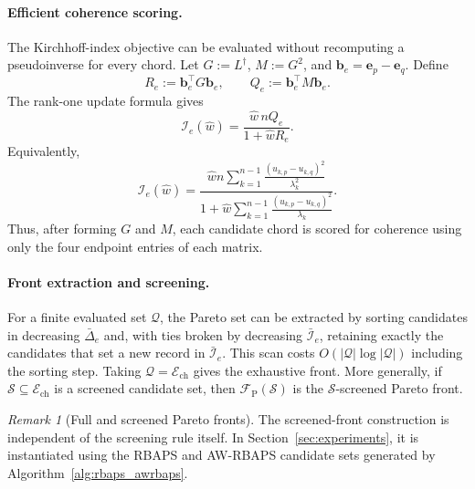 \documentclass[11pt]{article}
\numberwithin{equation}{section}
\theoremstyle{definition}
\theoremstyle{remark}
\newtheorem{remark}[theorem]{Remark}
\begin{document}
\paragraph{Efficient coherence scoring.}
The Kirchhoff-index objective can be evaluated without recomputing a
pseudoinverse for every chord. Let $G:=L^\dagger$, $M:=G^2$, and
$\boldsymbol b_e=\boldsymbol e_p-\boldsymbol e_q$. Define
\begin{equation}\label{eq:pareto_Re_Qe_def}
	R_e:=\boldsymbol b_e^\top G\boldsymbol b_e,
	\qquad
	Q_e:=\boldsymbol b_e^\top M\boldsymbol b_e .
\end{equation}
The rank-one update formula gives
\begin{equation}\label{eq:pareto_fast_kirchhoff}
	\mathcal I_e(\hat w)
	=
	\frac{\hat w\, n Q_e}{1+\hat w R_e}.
\end{equation}
Equivalently,
\begin{equation}\label{eq:pareto_fast_kirchhoff_spectral}
	\mathcal I_e(\hat w)
	=
	\frac{\hat w n\displaystyle\sum_{k=1}^{n-1}
		\frac{(u_{k,p}-u_{k,q})^2}{\lambda_k^2}}
	{1+\hat w\displaystyle\sum_{k=1}^{n-1}
		\frac{(u_{k,p}-u_{k,q})^2}{\lambda_k}}.
\end{equation}
Thus, after forming $G$ and $M$, each candidate chord is scored for
coherence using only the four endpoint entries of each matrix.

\paragraph{Front extraction and screening.}
For a finite evaluated set $\mathcal Q$, the Pareto set can be extracted by
sorting candidates in decreasing $\bar\Delta_e$ and, with ties broken by
decreasing $\bar{\mathcal I}_e$, retaining exactly the candidates that set a
new record in $\bar{\mathcal I}_e$. This scan costs
$O(|\mathcal Q|\log |\mathcal Q|)$ including the sorting step. Taking
$\mathcal Q=\mathcal E_{\mathrm{ch}}$ gives the exhaustive front. More
generally, if $\mathcal S\subseteq\mathcal E_{\mathrm{ch}}$ is a screened
candidate set, then $\mathcal F_{\mathrm P}(\mathcal S)$ is the
$\mathcal S$-screened Pareto front.
\begin{remark}[Full and screened Pareto fronts]
	\label{rem:screened_pareto_fronts}
	The screened-front construction is independent of the screening rule itself.
	In Section~\ref{sec:experiments}, it is instantiated using the RBAPS and
	AW-RBAPS candidate sets generated by Algorithm~\ref{alg:rbaps_awrbaps}.
\end{remark}
\end{document}
